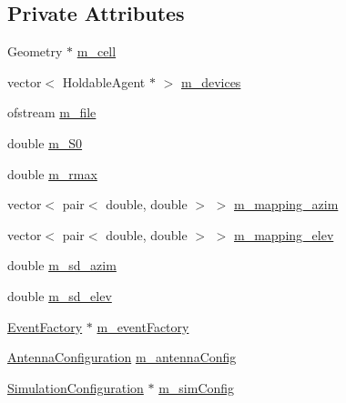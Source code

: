 \subsection*{Private Attributes}
\begin{DoxyCompactItemize}
\item 
Geometry $\ast$ \hyperlink{class_antenna_addbe8e6ae7a8bad737339d23bc2abbba}{m\+\_\+cell}
\item 
vector$<$ Holdable\+Agent $\ast$ $>$ \hyperlink{class_antenna_a2d0f7032eb1d8cc6c02b1dd64bc59856}{m\+\_\+devices}
\item 
ofstream \hyperlink{class_antenna_a06824840191e96b19eb224d53e08d3ec}{m\+\_\+file}
\item 
double \hyperlink{class_antenna_a65bdd3ec77862b9427df42ae74dc54e4}{m\+\_\+\+S0}
\item 
double \hyperlink{class_antenna_a7b8fda5c94e7cf03c14a0fe5447e5d46}{m\+\_\+rmax}
\item 
vector$<$ pair$<$ double, double $>$ $>$ \hyperlink{class_antenna_a0d4e25b246a30e3e6fdb303bed85e7da}{m\+\_\+mapping\+\_\+azim}
\item 
vector$<$ pair$<$ double, double $>$ $>$ \hyperlink{class_antenna_a71b55ca74697d064e231829343209fec}{m\+\_\+mapping\+\_\+elev}
\item 
double \hyperlink{class_antenna_af9ed0b78826b52bd60c497eb7f87be3d}{m\+\_\+sd\+\_\+azim}
\item 
double \hyperlink{class_antenna_aeb2ce4a95682b9ecff1395dfa857c089}{m\+\_\+sd\+\_\+elev}
\item 
\hyperlink{class_event_factory}{Event\+Factory} $\ast$ \hyperlink{class_antenna_a7044507cdeb0d10a92c61adaf243f5b5}{m\+\_\+event\+Factory}
\item 
\hyperlink{class_antenna_configuration}{Antenna\+Configuration} \hyperlink{class_antenna_a766312d18a74270713fc69cf55b2578b}{m\+\_\+antenna\+Config}
\item 
\hyperlink{class_simulation_configuration}{Simulation\+Configuration} $\ast$ \hyperlink{class_antenna_aa6a04536655e94183422cf1937d2897e}{m\+\_\+sim\+Config}
\end{DoxyCompactItemize}

